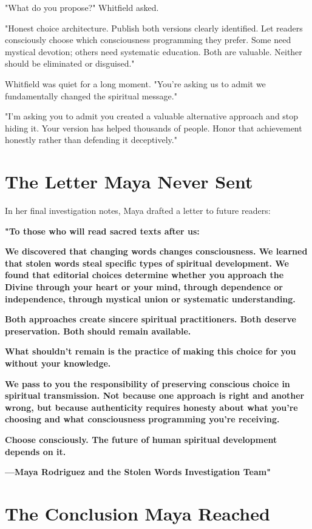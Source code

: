 \documentclass[11pt,twoside]{book}
\begin{document}
"What do you propose?" Whitfield asked.

"Honest choice architecture. Publish both versions clearly identified. Let readers consciously choose which consciousness programming they prefer. Some need mystical devotion; others need systematic education. Both are valuable. Neither should be eliminated or disguised."

Whitfield was quiet for a long moment. "You're asking us to admit we fundamentally changed the spiritual message."

"I'm asking you to admit you created a valuable alternative approach and stop hiding it. Your version has helped thousands of people. Honor that achievement honestly rather than defending it deceptively."
\section*{The Letter Maya Never Sent}
\label{sec:orgce87e81}

In her final investigation notes, Maya drafted a letter to future readers:

\textbf{"To those who will read sacred texts after us:}

\textbf{We discovered that changing words changes consciousness. We learned that stolen words steal specific types of spiritual development. We found that editorial choices determine whether you approach the Divine through your heart or your mind, through dependence or independence, through mystical union or systematic understanding.}

\textbf{Both approaches create sincere spiritual practitioners. Both deserve preservation. Both should remain available.}

\textbf{What shouldn't remain is the practice of making this choice for you without your knowledge.}

\textbf{We pass to you the responsibility of preserving conscious choice in spiritual transmission. Not because one approach is right and another wrong, but because authenticity requires honesty about what you're choosing and what consciousness programming you're receiving.}

\textbf{Choose consciously. The future of human spiritual development depends on it.}

\textbf{—Maya Rodriguez and the Stolen Words Investigation Team"}
\section*{The Conclusion Maya Reached}
\label{sec:org30fe09b}
\end{document}
